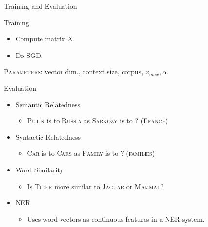 \begin{frame}{Training and Evaluation}

  \begin{exampleblock}{Training}
    \begin{itemize}[<+->]
    \item Compute matrix $X$
    \item Do SGD.
    \end{itemize}
    \textsc{Parameters:} vector dim., context size, corpus, $x_{max},\alpha$.
  \end{exampleblock}
  
  \begin{exampleblock}{Evaluation}
    \begin{itemize}[<+->]
    \item Semantic Relatedness %
      \begin{itemize}
      \item \textsc{Putin} is to \textsc{Russia} as \textsc{Sarkozy} is to ? (\textsc{France})
      \end{itemize}
    \item Syntactic Relatedness %
      \begin{itemize}
      \item \textsc{Car} is to \textsc{Cars} as \textsc{Family} is to ? (\textsc{families})
      \end{itemize}
    \item Word Similarity
      \begin{itemize}
      \item Is \textsc{Tiger} more similar to \textsc{Jaguar} or \textsc{Mammal}?
        \end{itemize}
    \item NER 
      \begin{itemize}
      \item Uses word vectors as continuous features in a NER system.
      \end{itemize}
    \end{itemize}
  \end{exampleblock}
\end{frame}

